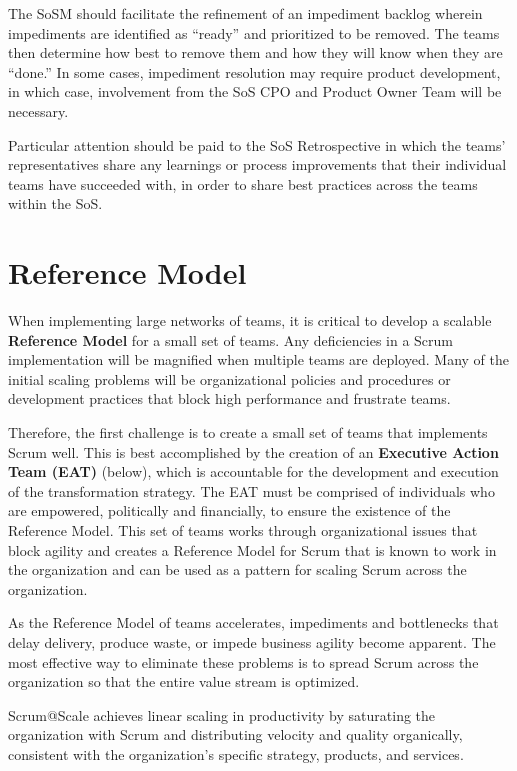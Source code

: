 \documentclass[12pt,a4paper,parskip=full]{scrartcl}
\begin{document}
The SoSM should facilitate the refinement of an impediment backlog wherein impediments are identified as ``ready'' and prioritized to be removed. The teams then determine how best to remove them and how they will know when they are ``done.'' In some cases, impediment resolution may require product development, in which case, involvement from the SoS CPO and Product Owner Team will be necessary.


Particular attention should be paid to the SoS Retrospective in which the teams' representatives share any learnings or process improvements that their individual teams have succeeded with, in order to share best practices across the teams within the SoS.  

\section{Reference Model}

When implementing large networks of teams, it is critical to develop a scalable \textbf{Reference Model} for a small set of teams. Any deficiencies in a Scrum implementation will be magnified when multiple teams are deployed. Many of the initial scaling problems will be organizational policies and procedures or development practices that block high performance and frustrate teams. 

Therefore, the first challenge is to create a small set of teams that implements Scrum well.  This is best accomplished by the creation of an \textbf{Executive Action Team (EAT)} (below), which is accountable for the development and execution of the transformation strategy.  The EAT must be comprised of individuals who are empowered, politically and financially, to ensure the existence of the Reference Model. This set of teams works through organizational issues that block agility and creates a Reference Model for Scrum that is known to work in the organization and can be used as a pattern for scaling Scrum across the organization.

As the Reference Model of teams accelerates, impediments and bottlenecks that delay delivery, produce waste, or impede business agility become apparent. The most effective way to eliminate these problems is to spread Scrum across the organization so that the entire value stream is optimized.

Scrum@Scale achieves linear scaling in productivity by saturating the organization with Scrum and distributing velocity and quality organically, consistent with the organization's specific strategy, products, and services.
\end{document}
